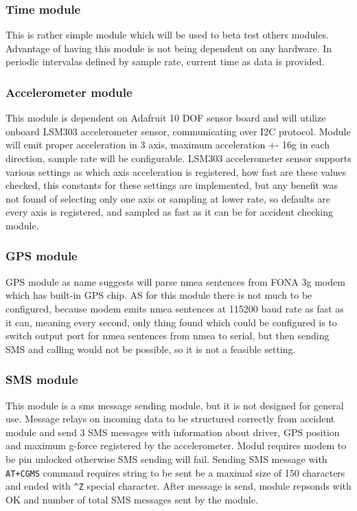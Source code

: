 \subsubsection{Time module} %
\label{ssub:time_module}
This is rather simple module which will be used to beta test others modules. Advantage of having this module is not being dependent on any hardware. In periodic intervalas defined by sample rate, current time as data is provided.
\subsubsection{Accelerometer module} %
This module is dependent on Adafruit 10 DOF sensor board and will utilize onboard LSM303 accelerometer sensor, communicating over I2C protocol. Module will emit proper acceleration in 3 axis, maximum acceleration +- 16g in each direction, sample rate will be configurable. LSM303 accelerometer sensor supports various settings as which axis acceleration is registered, how fast are these values checked, this constants for these settings are implemented, but any benefit was not found of selecting only one axis or sampling at lower rate, so defaults are every axis is registered, and sampled as fast as it can be for accident checking module.
\label{ssub:accelerometer_module}
\subsubsection{GPS module} %
\label{ssub:gps_module}
GPS module as name suggests will parse nmea sentences from FONA 3g modem which has built-in GPS chip. AS for this module there is not much to be configured, because modem emits nmea sentences at 115200 baud rate as fast as it can, meaning every second, only thing found which could be configured is to switch output port for nmea sentences from nmea to serial, but then sending SMS and calling would not be possible, so it is not a feasible setting.
\subsubsection{SMS module} %
\label{ssub:sms_module}
This module is a sms message sending module, but it is not designed for general use. Message relays on incoming data to be structured correctly from accident module and send 3 SMS messages with information about driver, GPS position and maximum g-force registered by the accelerometer. Modul requires modem to be pin unlocked otherwise SMS sending will fail. Sending SMS message with \verb|AT+CGMS| command requires string to be sent be a maximal size of 150 characters and ended with \verb|^Z| special character. After message is send, module repsonds with OK and number of total SMS messages sent by the module.
